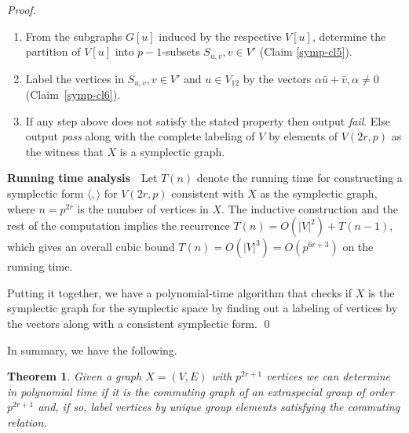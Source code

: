 \documentclass{elsarticle}
\newtheorem{theorem}{Theorem}[section]
\newcommand{\sympl}[1]{\langle #1 \rangle}
\begin{document}
\begin{proof}
\begin{enumerate}
\item From the subgraphs $G[u]$ induced by the respective $V[u]$,
  determine the partition of $V[u]$ into $p-1$-subsets $S_{u,v}, v\in
  V'$ (Claim \ref{symp-cl5}).

\item Label the vertices in $S_{u,v}, v\in V'$ and $u\in V_{12}$ by
  the vectors $\alpha\bar{u}+\bar{v}, \alpha\ne 0$
  (Claim~\ref{symp-cl6}).

\item If any step above does not satisfy the stated property then
  output \emph{fail}. Else output \emph{pass} along with the complete
  labeling of $V$ by elements of $V(2r,p)$ as the witness that $X$ is
  a symplectic graph.
\end{enumerate}

\noindent\textbf{Running time analysis}~~Let $T(n)$ denote the
running time for constructing a symplectic form $\sympl{,}$ for
$V(2r,p)$ consistent with $X$ as the symplectic graph, where
$n=p^{2r}$ is the number of vertices in $X$. The inductive
construction and the rest of the computation implies the recurrence
$T(n) = O(|V|^2) +T(n-1)$, which gives an overall cubic bound
$T(n)=O(|V|^3)=O(p^{6r+3})$ on the running time.

Putting it together, we have a polynomial-time algorithm that checks
if $X$ is the symplectic graph for the symplectic space by finding
out a labeling of vertices by the vectors along with a consistent
symplectic form. \qed
\end{proof}

In summary, we have the following.

\begin{theorem}
  Given a graph $X=(V,E)$ with $p^{2r+1}$ vertices we can determine in
  polynomial time if it is the commuting graph of an extraspecial
  group of order $p^{2r+1}$ and, if so, label vertices by unique group
  elements satisfying the commuting relation.
\end{theorem}
\end{document}
